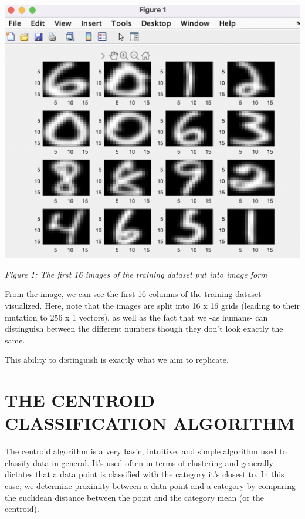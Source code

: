 \documentclass[dvipsnames,12pt]{article} %
\begin{document}
    \begin{center}
        \includegraphics[scale=0.8]{Images/MAT 167 FPP Fig 1.png}

        \textit{Figure 1: The first 16 images of the training dataset put into image form}
    \end{center}

    \hskip 12pt From the image, we can see the first 16 columns of the training dataset visualized. Here, note that the images are split into 16 x 16 grids (leading to their mutation to 256 x 1 vectors), as well as the fact that we -as humans- can distinguish between the different numbers though they don't look exactly the same. 

    \vskip 06pt

    \hskip 12pt This ability to distinguish is exactly what we aim to replicate.

  \section{THE CENTROID CLASSIFICATION ALGORITHM}
    \label{SECT 03:THE CENTROID ALGORITHM}

      \hskip 12pt The centroid algorithm is a very basic, intuitive, and simple algorithm used to classify data in general. It's used often in terms of clustering and generally dictates that a data point is classified with the category it's closest to. In this case, we determine proximity between a data point and a category by comparing the euclidean distance between the point and the category mean (or the centroid).
\end{document}
